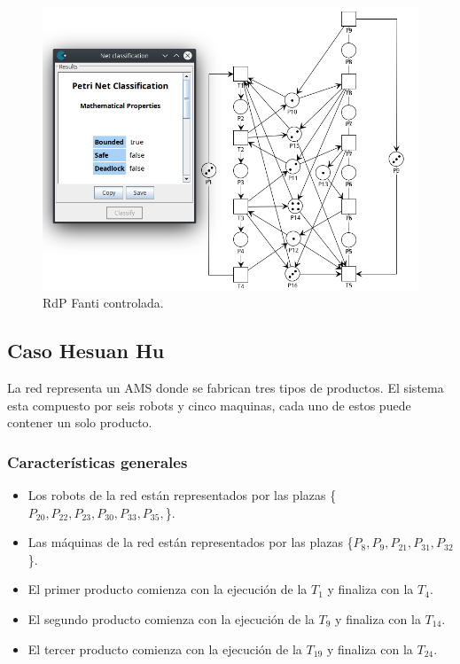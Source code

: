 \begin{figure}[H]
	\centering
	\includegraphics[width=\textwidth]{Figures/testing/fanti_controlada.png}
	\caption[RdP Fanti controlada]{RdP Fanti controlada.}
	\label{fig:fanticontrolada}
 \end{figure}
 
\subsection{Caso Hesuan Hu}
La red representa un AMS donde se fabrican tres tipos de productos. El sistema esta compuesto por seis robots y cinco maquinas, cada uno de estos puede contener un solo producto.

 \subsubsection{Características generales}
\begin{itemize}
    \item Los robots de la red están representados por las plazas \{$P_{20},P_{22},P_{23},P_{30},P_{33},P_{35},$\}.
    \item Las máquinas de la red están representados por las plazas \{$P_{8},P_{9},P_{21},P_{31},P_{32}$\}.
    \item El primer producto comienza con la ejecución de la {$T_1$} y finaliza con la {$T_4$}.
    \item El segundo producto comienza con la ejecución de la {$T_9$} y finaliza con la {$T_{14}$}.
    \item El tercer producto comienza con la ejecución de la {$T_{19}$} y finaliza con la {$T_{24}$}.
\end{itemize}

